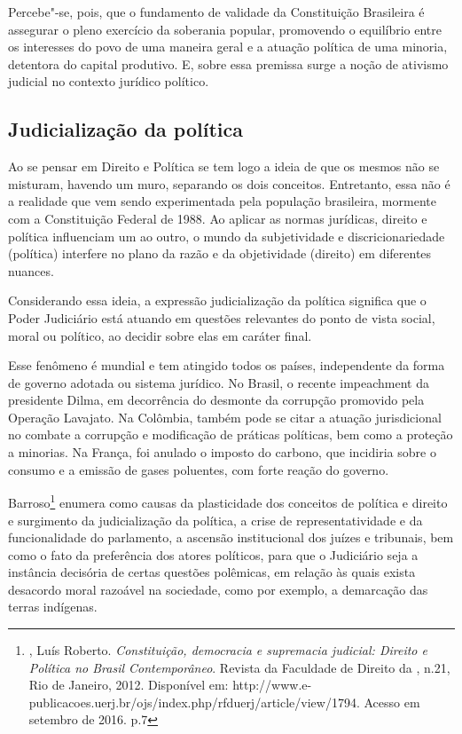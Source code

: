 Percebe"-se, pois, que o fundamento de validade da Constituição
Brasileira é assegurar o pleno exercício da soberania popular,
promovendo o equilíbrio entre os interesses do povo de uma maneira geral
e a atuação política de uma minoria, detentora do capital produtivo. E,
sobre essa premissa surge a noção de ativismo judicial no contexto
jurídico político.

\subsection{Judicialização da política}

Ao se pensar em Direito e Política se tem logo a ideia de que os mesmos
não se misturam, havendo um muro, separando os dois conceitos.
Entretanto, essa não é a realidade que vem sendo experimentada pela
população brasileira, mormente com a Constituição Federal de 1988. Ao
aplicar as normas jurídicas, direito e política influenciam um ao outro,
o mundo da subjetividade e discricionariedade (política) interfere no
plano da razão e da objetividade (direito) em diferentes nuances.

Considerando essa ideia, a expressão judicialização da política
significa que o Poder Judiciário está atuando em questões relevantes do
ponto de vista social, moral ou político, ao decidir sobre elas em
caráter final.

Esse fenômeno é mundial e tem atingido todos os países, independente da
forma de governo adotada ou sistema jurídico. No Brasil, o recente
impeachment da presidente Dilma, em decorrência do desmonte da corrupção
promovido pela Operação Lavajato. Na Colômbia, também pode se citar a
atuação jurisdicional no combate a corrupção e modificação de práticas
políticas, bem como a proteção a minorias. Na França, foi anulado o
imposto do carbono, que incidiria sobre o consumo e a emissão de gases
poluentes, com forte reação do governo.

Barroso\footnote{, Luís Roberto. \emph{Constituição,
  democracia e supremacia judicial: Direito e Política no Brasil
  Contemporâneo}. Revista da Faculdade de Direito da , n.21, Rio de
  Janeiro, 2012. Disponível em:
http://www.e-publicacoes.uerj.br/ojs/index.php/rfduerj/article/view/1794. 
Acesso em setembro de 2016. p.7} enumera como causas da plasticidade
dos conceitos de política e direito e surgimento da judicialização da
política, a crise de representatividade e da funcionalidade do
parlamento, a ascensão institucional dos juízes e tribunais, bem como o
fato da preferência dos atores políticos, para que o Judiciário seja a
instância decisória de certas questões polêmicas, em relação às quais
exista desacordo moral razoável na sociedade, como por exemplo, a
demarcação das terras indígenas.

